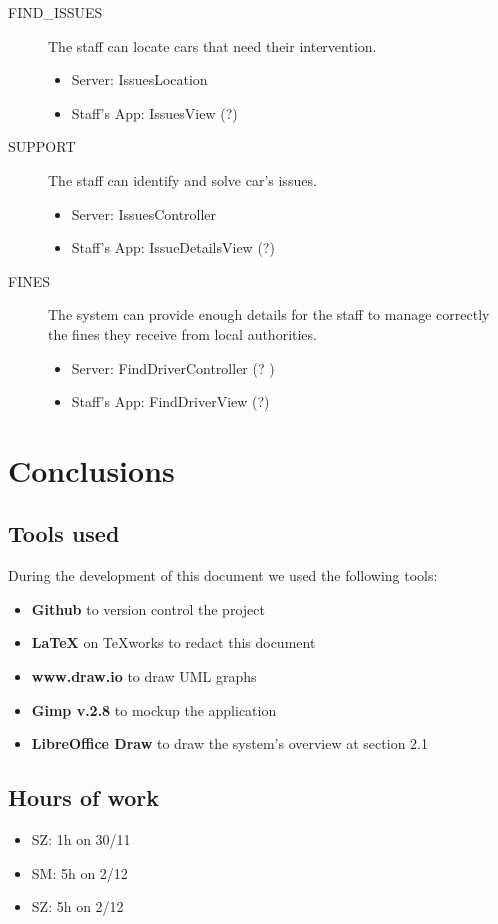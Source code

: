 \documentclass[11pt]{article} %
\begin{document}
\begin{description}
	\item[FIND\_ISSUES] The staff can locate cars that need their intervention.
	\begin{itemize}
		\item Server: IssuesLocation
		\item Staff's App: IssuesView (?)
	\end{itemize}

	\item[SUPPORT] The staff can identify and solve car's issues.
	\begin{itemize}
		\item Server: IssuesController
		\item Staff's App: IssueDetailsView (?)
	\end{itemize}

	\item[FINES] The system can provide enough details for the staff to manage correctly the fines they receive from local authorities.
	\begin{itemize}
		\item Server: FindDriverController (?
)
		\item Staff's App: FindDriverView (?)
	\end{itemize}

 \end{description}


\newpage
\section{Conclusions}

\subsection{Tools used}
During the development of this document we used the following tools:
\begin{itemize}
	\item \textbf{Github} to version control the project
	\item \textbf{\LaTeX} on TeXworks to redact this document
	\item \textbf{www.draw.io} to draw UML graphs
	\item \textbf{Gimp v.2.8} to mockup the application
	\item \textbf{LibreOffice Draw} to draw the system's overview at section 2.1
\end{itemize}

\subsection{Hours of work}
\begin{itemize}
	\item SZ: 1h on 30/11
	\item SM: 5h on 2/12
	\item SZ: 5h on 2/12
\end{itemize}
\end{document}
